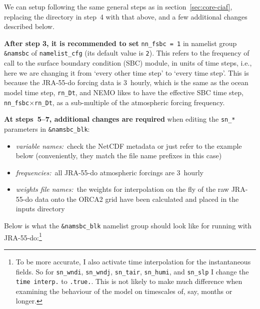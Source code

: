 We can setup following the same general steps as in section~\ref{sec:core-ciaf}, replacing the directory in step~4 with that above, and a few additional changes described below.

\textbf{After step 3, it is recommended to set} \verb|nn_fsbc = 1| in namelist group \verb|&namsbc| of \verb|namelist_cfg| (its default value is \verb|2|).
This refers to the frequency of call to the surface boundary condition (SBC) module, in units of time steps, i.e., here we are changing it from `every other time step' to `every time step'.
This is because the \mbox{JRA-55-do} forcing data is 3~hourly, which is the same as the ocean model time step, \verb|rn_Dt|, and NEMO likes to have the effective SBC time step, \verb|nn_fsbc|$\times$\verb|rn_Dt|, as a sub-multiple of the atmospheric forcing frequency.

\textbf{At steps~\mbox{5--7}, additional changes are required} when editing the \verb|sn_*| parameters in \verb|&namsbc_blk|:

\begin{itemize}
    \item\textit{variable names:}~check the NetCDF metadata or just refer to the example below (conveniently, they match the file name prefixes in this case)
    \item\textit{frequencies:}~all \mbox{JRA-55-do} atmospheric forcings are 3~hourly
    \item\textit{weights file names:}~the weights for interpolation on the fly of the raw \mbox{JRA-55-do} data onto the ORCA2 grid have been calculated and placed in the inputs directory
\end{itemize}

Below is what the \verb|&namsbc_blk| namelist group should look like for running with \mbox{JRA-55-do}:\footnote{
    To be more accurate, I also activate time interpolation for the instantaneous fields.
    So for \texttt{sn\_wndi}, \texttt{sn\_wndj}, \texttt{sn\_tair}, \texttt{sn\_humi}, and \texttt{sn\_slp} I change the \texttt{time interp.} to \texttt{.true.}.
    This is not likely to make much difference when examining the behaviour of the model on timescales of, say, months or longer.
}

